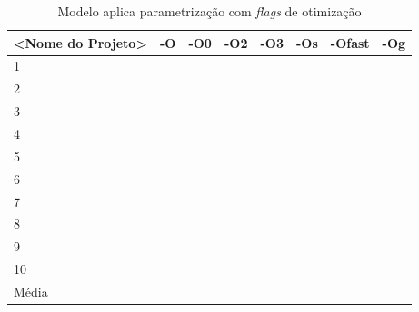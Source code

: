 \begin{table}[!ht]
\centering
\tiny
\caption{Modelo aplica parametrização com \textit{flags} de otimização}
\label{tab:modelo_otimizacao_compilacao}
\begin{tabular}{llllllll}
\textbf{<Nome do Projeto>} & \textbf{-O} & \textbf{-O0} & \textbf{-O2} & \textbf{-O3} & \textbf{-Os} & \textbf{-Ofast} & \textbf{-Og} \\ \toprule
1                          &             &              &              &              &              &                 &        \\ 
2                          &             &              &              &              &              &                 &        \\ 
3                          &             &              &              &              &              &                 &        \\ 
4                          &             &              &              &              &              &                 &        \\ 
5                          &             &              &              &              &              &                 &        \\ 
6                          &             &              &              &              &              &                 &        \\ 
7                          &             &              &              &              &              &                 &        \\ 
8                          &             &              &              &              &              &                 &        \\ 
9                          &             &              &              &              &              &                 &        \\ 
10                         &             &              &              &              &              &                 &        \\ \bottomrule
Média                      &             &              &              &              &              &                 &        \\ 
\end{tabular}
\end{table}

